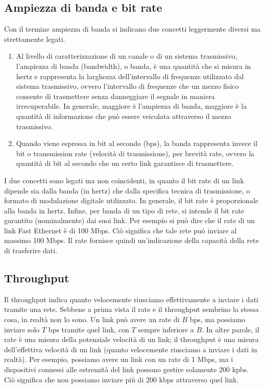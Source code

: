 \subsection{Ampiezza di banda e bit rate}
Con il termine ampiezza di banda si indicano due concetti leggermente diversi ma strettamente legati. 
\begin{enumerate}
    \item Al livello di caratterizzazione di un canale o di un sistema trasmissivo, l'ampiezza di banda (bandwidth), o banda, è una quantità che si misura in hertz e rappresenta la larghezza dell'intervallo di frequenze utilizzato dal sistema trasmissivo, ovvero l'intervallo di frequenze che un mezzo fisico consente di trasmettere senza danneggiare il segnale in maniera irrecuperabile. In generale, maggiore è l'ampiezza di banda, maggiore è la quantità di informazione che può essere veicolata attraverso il mezzo trasmissivo.
    \item Quando viene espressa in bit al secondo (bps), la banda rappresenta invece il bit o transmission rate (velocità di trasmissione), per brevità rate, ovvero la quantità di bit al secondo che un certo link garantisce di trasmettere.
\end{enumerate}

I due concetti sono legati ma non coincidenti, in quanto il bit rate di un link dipende sia dalla banda (in hertz) che dalla specifica tecnica di trasmissione, o formato di modulazione digitale utilizzato. In generale, il bit rate è proporzionale alla banda in hertz. Infine, per banda di un tipo di rete, si intende il bit rate garantito (nominalmente) dai suoi link. Per esempio si può dire che il rate di un link Fast Ethernet è di 100 Mbps. Ciò significa che tale rete può inviare al massimo 100 Mbps. Il rate fornisce quindi un'indicazione della capacità della rete di trasferire dati.

\subsection{Throughput}
Il throughput indica quanto velocemente riusciamo effettivamente a inviare i dati tramite una rete. Sebbene a prima vista il rate e il throughput sembrino la stessa cosa, in realtà non lo sono. Un link può avere un rate di $B$ bps, ma possiamo inviare solo $T$ bps tramite quel link, con $T$ sempre inferiore a $B$. In altre parole, il rate è una misura della potenziale velocità di un link; il throughput è una misura dell'effettiva velocità di un link (quanto velocemente riusciamo a inviare i dati in realtà). Per esempio, possiamo avere un link con un rate di 1 Mbps, ma i dispositivi connessi alle estremità del link possono gestire solamente 200 kpbs. Ciò significa che non possiamo inviare più di 200 kbps attraverso quel link.

